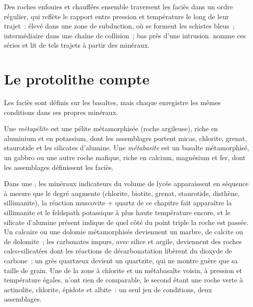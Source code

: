 Des roches enfouies et chauffées ensemble traversent les faciès dans un ordre régulier, qui
reflète le rapport entre pression et température le long de leur trajet~: élevé dans une zone de subduction,
où se forment les schistes bleus~; intermédiaire dans une chaîne de collision~; bas près d'une intrusion.
 nomme ces séries et lit de tels trajets à partir des minéraux.

\section{Le protolithe compte}\label{sec:b2:metamorphic-facies:protoliths}

Les faciès sont définis sur les basaltes, mais chaque  enregistre les mêmes conditions dans
ses propres minéraux.

\begin{definition}\label{def:b2:metamorphic-facies:protoliths}
Une \emph{métapélite} est une pélite métamorphisée (roche argileuse), riche en
aluminium et en potassium, dont les assemblages portent micas, chlorite, grenat, staurotide et
les silicates d'alumine. Une \emph{métabasite} est un basalte métamorphisé, un gabbro ou
une autre roche mafique, riche en calcium, magnésium et fer, dont les assemblages définissent
les faciès.
\end{definition}

Dans une , les minéraux indicateurs du volume de lycée apparaissent en séquence à mesure que le degré
augmente (chlorite, biotite, grenat, staurotide, disthène, sillimanite), la réaction muscovite + quartz de ce chapitre
fait apparaître la sillimanite et le feldspath potassique à plus haute température encore, et le silicate d'alumine présent
indique de quel côté du point triple la roche est passée. Un calcaire ou une dolomie métamorphisés
deviennent un marbre, de calcite ou de dolomite~; les carbonates impurs, avec silice et argile,
deviennent des roches calco-silicatées dont les réactions de décarbonatation libèrent du dioxyde de carbone~;
un grès quartzeux devient un quartzite, qui ne montre guère que sa taille de grain.
Une  de la zone à chlorite et un métabasalte voisin,
à pression et température égales, n'ont rien de comparable,
le second étant une roche verte à actinolite, chlorite, épidote et albite~:
un seul jeu de conditions, deux assemblages.


